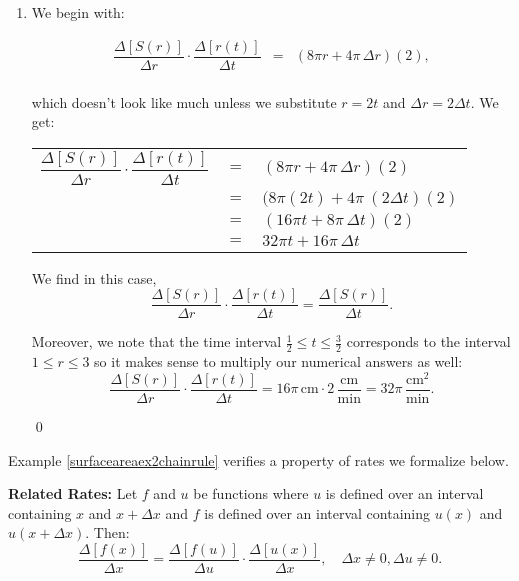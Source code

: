 \begin{ex}
\begin{enumerate}
                          
\item  We begin with: 
 
\[ \begin{array}{rcl}

\dfrac{\Delta[S(r)]}{\Delta r}  \cdot \dfrac{\Delta[r(t)]}{\Delta t} & = & (8 \pi r + 4 \pi \, \Delta r)(2),   \\ \end{array} \]

 which doesn't look like much unless we substitute $r = 2t$ and $\Delta r = 2 \Delta t$.  We get:

\begin{longtable}{rcl}

$\dfrac{\Delta[S(r)]}{\Delta r}  \cdot \dfrac{\Delta[r(t)]}{\Delta t}$ & $=$ & $(8 \pi r + 4 \pi \, \Delta r)(2)$   \\[10pt]
                 & $=$ & $(8 \pi (2t) + 4 \pi \ (2 \Delta t)(2)$\\[10pt]
                 & $=$ & $(16 \pi t + 8 \pi \,  \Delta t)(2)$\\[10pt]
                  & $=$ & $32 \pi t + 16 \pi \,  \Delta t$ \\ \end{longtable} 
                     
We find in this case,   \[ \dfrac{\Delta[S(r)]}{\Delta r}  \cdot \dfrac{\Delta[r(t)]}{\Delta t}   =  \dfrac{\Delta[S(r)]}{\Delta t}.\] 

Moreover, we note that the time interval $\frac{1}{2} \leq t \leq \frac{3}{2}$ corresponds to the interval $1 \leq r \leq 3$ so it makes sense to multiply our numerical answers as well: \[ \dfrac{\Delta[S(r)]}{\Delta r}  \cdot \dfrac{\Delta[r(t)]}{\Delta t} = 16 \pi \, \text{cm} \cdot 2 \, \frac{\text{cm}}{\text{min}} = 32 \pi \, \frac{\text{cm}^2}{\text{min}}.\]

\hfill \qed
	 
\end{enumerate}


\end{ex}

Example \ref{surfaceareaex2chainrule} verifies a property of rates we formalize below.

\medskip

\colorbox{ResultColor}{\bbm

\begin{thm}\label{relatedratesaroc} \textbf{Related Rates:} 
Let $f$ and $u$ be functions where $u$ is defined over an interval containing $x$ and $x+\Delta x$ and $f$ is defined over an interval containing $u(x)$ and $u(x + \Delta x)$.  Then:
\[ \dfrac{ \Delta[f(x)]}{\Delta x} =  \dfrac{ \Delta[f(u)]}{\Delta u}  \cdot  \dfrac{ \Delta[u(x)]}{\Delta x}, \quad \Delta x \neq 0,  \Delta u  \neq 0. \]

\end{thm}
\ebm}


